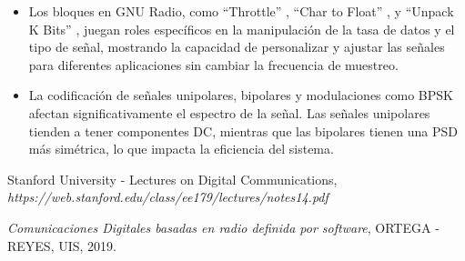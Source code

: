 \documentclass{journal}[IEEEtran, twocolumn]             %
\begin{document}
\begin{multicols}{2}
\begin{itemize}
    \item Los bloques en GNU Radio, como ``Throttle'' , ``Char to Float'' , y ``Unpack K Bits'' , juegan roles específicos en la manipulación de la tasa de datos y el tipo de señal, mostrando la capacidad de personalizar y ajustar las señales para diferentes aplicaciones sin cambiar la frecuencia de muestreo.
    \item La codificación de señales unipolares, bipolares y modulaciones como BPSK afectan significativamente el espectro de la señal. Las señales unipolares tienden a tener componentes DC, mientras que las bipolares tienen una PSD más simétrica, lo que impacta la eficiencia del sistema.
     
\end{itemize}

\begin{thebibliography}{1}

Stanford University - Lectures on Digital Communications, \textit{https://web.stanford.edu/class/ee179/lectures/notes14.pdf}

\textit{Comunicaciones Digitales basadas en radio definida por software}, ORTEGA - REYES, UIS, 2019.

\end{thebibliography}

\end{multicols}
\end{document}
